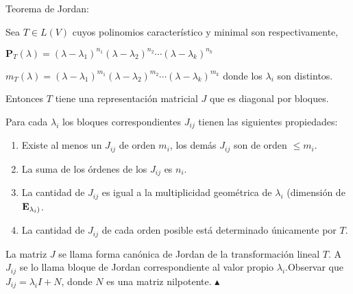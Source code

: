 \bigskip


\bigskip


\begin{corollary} {Teorema de Jordan:}


Sea $T\in L(V)$ cuyos polinomios característico y minimal son respectivamente, 

\bigskip

$\mathbf{P}_T (\lambda)=(\lambda-\lambda_1)^{n_1} (\lambda-\lambda_2)^{n_2}\cdots(\lambda-\lambda_k)^{n_k}$


\bigskip

$m_T(\lambda)=(\lambda-\lambda_1)^{m_1} (\lambda-\lambda_2)^{m_2}\cdots(\lambda-\lambda_k)^{m_k}$
\noindent
donde los $\lambda_i$ son distintos. 

\bigskip

Entonces $T$ tiene una representación matricial  $J$ que es diagonal por bloques. 

Para cada $\lambda_i$ los bloques correspondientes $J_{ij}$ tienen las siguientes propiedades:

 \begin{enumerate}
 
 \bigskip
 
\item Existe al menos un $J_{ij}$ de orden $m_i$, los demás  $J_{ij}$ son de orden $\leq m_i$.

\bigskip

\item La suma de los órdenes de los $J_{ij}$ es $n_i$.

\bigskip

\item  La cantidad de $J_{ij}$ es igual a la multiplicidad geométrica de $\lambda_i$ (dimensión de $\bold{E}_{\lambda_i)}$.

\bigskip


\item La cantidad de $J_{ij}$ de cada orden posible está determinado únicamente por $T$.


\end{enumerate}


\bigskip

\end{corollary}

\bigskip


\bigskip


\begin{remark}
La matriz  $J$ se llama forma canónica de Jordan de la transformación lineal  $T$. A $J_{ij}$ se lo llama bloque de Jordan correspondiente al valor propio $\lambda_i $.Observar que $J_{ij}=\lambda_iI + N$, donde $N$ es una matriz nilpotente.
\hfill$\blacktriangle$
\end{remark}

